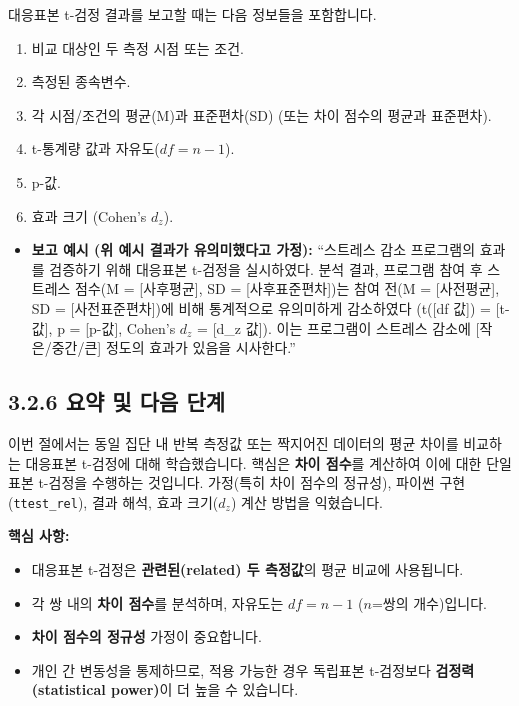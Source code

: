 \documentclass[
  letterpaper,
]{book}
\providecommand{\tightlist}{%
  \setlength{\itemsep}{0pt}\setlength{\parskip}{0pt}}
\begin{document}
대응표본 t-검정 결과를 보고할 때는 다음 정보들을 포함합니다.

\begin{enumerate}
\def\labelenumi{\arabic{enumi}.}
\tightlist
\item
  비교 대상인 두 측정 시점 또는 조건.
\item
  측정된 종속변수.
\item
  각 시점/조건의 평균(M)과 표준편차(SD) (또는 차이 점수의 평균과
  표준편차).
\item
  t-통계량 값과 자유도(\(df = n-1\)).
\item
  p-값.
\item
  효과 크기 (Cohen's \(d_z\)).
\end{enumerate}

\begin{itemize}
\tightlist
\item
  \textbf{보고 예시 (위 예시 결과가 유의미했다고 가정):} ``스트레스 감소
  프로그램의 효과를 검증하기 위해 대응표본 t-검정을 실시하였다. 분석
  결과, 프로그램 참여 후 스트레스 점수(M = {[}사후평균{]}, SD =
  {[}사후표준편차{]})는 참여 전(M = {[}사전평균{]}, SD =
  {[}사전표준편차{]})에 비해 통계적으로 유의미하게 감소하였다 (t({[}df
  값{]}) = {[}t-값{]}, p = {[}p-값{]}, Cohen's \(d_z\) = {[}d\_z 값{]}).
  이는 프로그램이 스트레스 감소에 {[}작은/중간/큰{]} 정도의 효과가
  있음을 시사한다.''
\end{itemize}

\subsection{3.2.6 요약 및 다음
단계}\label{uxc694uxc57d-uxbc0f-uxb2e4uxc74c-uxb2e8uxacc4-1}

이번 절에서는 동일 집단 내 반복 측정값 또는 짝지어진 데이터의 평균
차이를 비교하는 대응표본 t-검정에 대해 학습했습니다. 핵심은 \textbf{차이
점수}를 계산하여 이에 대한 단일 표본 t-검정을 수행하는 것입니다.
가정(특히 차이 점수의 정규성), 파이썬 구현(\texttt{ttest\_rel}), 결과
해석, 효과 크기(\(d_z\)) 계산 방법을 익혔습니다.

\textbf{핵심 사항:}

\begin{itemize}
\tightlist
\item
  대응표본 t-검정은 \textbf{관련된(related) 두 측정값}의 평균 비교에
  사용됩니다.
\item
  각 쌍 내의 \textbf{차이 점수}를 분석하며, 자유도는 \(df = n-1\)
  (\(n\)=쌍의 개수)입니다.
\item
  \textbf{차이 점수의 정규성} 가정이 중요합니다.
\item
  개인 간 변동성을 통제하므로, 적용 가능한 경우 독립표본 t-검정보다
  \textbf{검정력(statistical power)}이 더 높을 수 있습니다.
\end{itemize}
\end{document}
